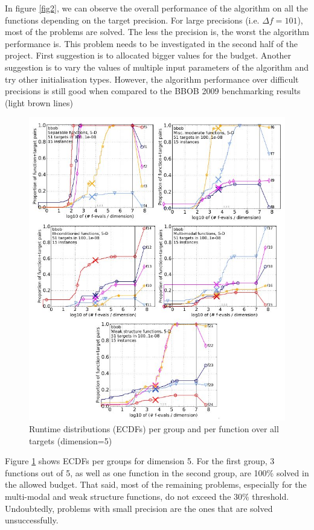 \documentclass{article}
\begin{document}
In figure \ref{fig2}, we can observe the overall performance of the algorithm on all the functions depending on the target precision. For large precisions (i.e. $\Delta f = 101$), most of the problems are solved. The less the precision is, the worst the algorithm performance is. This problem needs to be investigated in the second half of the project. First suggestion is to allocated bigger values for the budget. Another suggestion is to vary the values of multiple input parameters of the algorithm and try other initialisation types. 
However, the algorithm performance over difficult precisions is still good when compared to the BBOB 2009 benchmarking results (light brown lines)

\begin{figure}[H]
	\begin{center} 
		\includegraphics[scale=0.5]{figures/graphs3.png}
		\caption{Runtime distributions (ECDFs) per group and per function over all targets (dimension=5)}
		\label{fig3}
	\end{center}
\end{figure}


Figure \ref{fig3} shows ECDFs per groups for dimension 5. For the first group, 3 functions out of 5, as well as one function in the second group, are 100\% solved in the allowed budget. That said, most of the remaining problems, especially for the multi-modal and weak structure functions, do not exceed the 30\% threshold. Undoubtedly, problems with small precision are the ones that are solved unsuccessfully. 
\end{document}
